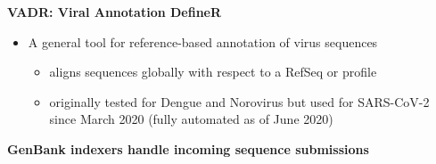 \documentclass[landscape]{slides}
\begin{document}
\begin{slide}
\begin{center}
\Large{\textbf{VADR: Viral Annotation DefineR}}
\end{center}

\begin{itemize}
  \item A general tool for reference-based annotation of virus sequences
    \begin{itemize}
      \item aligns sequences globally with respect to a RefSeq or
        profile
      \item originally tested for Dengue and Norovirus but used for
        SARS-CoV-2 since March 2020 (fully automated as of June 2020)
    \end{itemize}
\end{itemize}


\vfill
\end{slide}
\begin{slide}
\begin{center}
\large{\textbf{GenBank indexers handle incoming sequence submissions}}
\end{center}


\vfill
\end{slide}
\end{document}
